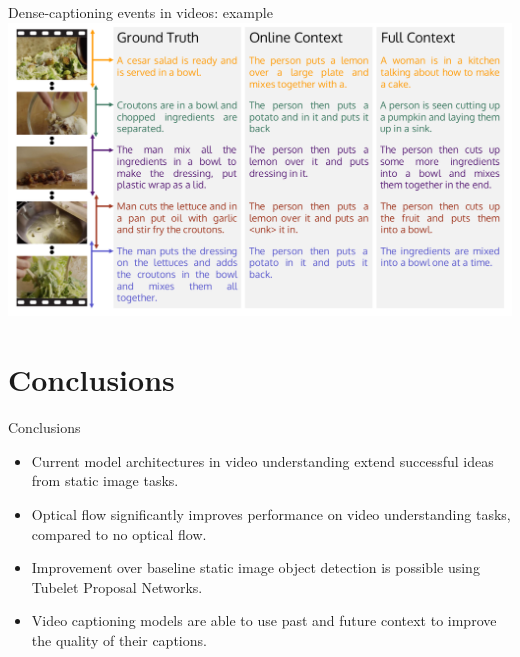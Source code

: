 \documentclass{beamer}
\begin{document}
{%
\begin{frame}[fragile]{Dense-captioning events in videos: example}
        \center
        \hspace*{0.5cm}\includegraphics[scale=0.25]{data/dense-captioning-video-example.png}
\end{frame}
}

\section{Conclusions}

\begin{frame}[fragile]{Conclusions}
        \begin{itemize}[<+- | alert@+>]
                \item Current model architectures in video understanding extend
                        successful ideas from static image tasks.

                \item Optical flow significantly improves performance on video
                        understanding tasks, compared to no optical flow.

                \item Improvement over baseline static image object detection
                        is possible using Tubelet Proposal Networks.

                \item Video captioning models are able to use past and future
                        context to improve the quality of their captions.
        \end{itemize}
\end{frame}

\end{document}
